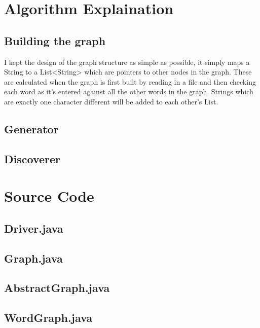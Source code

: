 \documentclass[12pt, titlepage, a4paper, twoside]{article}
\begin{document}
\section*{Algorithm Explaination}

\subsection*{Building the graph}
I kept the design of the graph structure as simple as possible, it simply maps
a String to a List<String> which are pointers to other nodes in the graph. These
are calculated when the graph is first built by reading in a file and then checking
each word as it's entered against all the other words in the graph. Strings which
are exactly one character different will be added to each other's List.

\subsection*{Generator}

\subsection*{Discoverer}

\newpage
\section*{Source Code}

\subsection*{Driver.java}

\newpage

\subsection*{Graph.java}

\newpage

\subsection*{AbstractGraph.java}

\newpage

\subsection*{WordGraph.java}

\newpage
\end{document}
